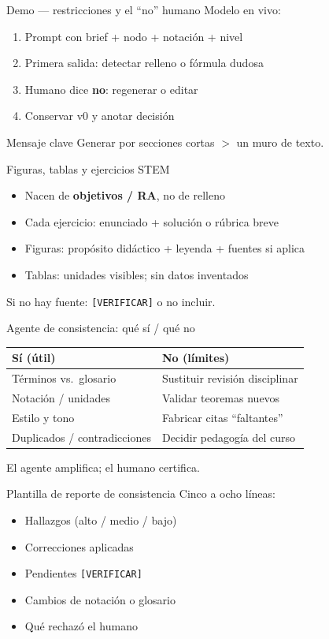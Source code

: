 \documentclass[aspectratio=169,11pt]{beamer}
\begin{document}
\begin{frame}{Demo --- restricciones y el ``no'' humano}
Modelo en vivo:
\begin{enumerate}
\item Prompt con brief + nodo + notación + nivel
\item Primera salida: detectar relleno o fórmula dudosa
\item Humano dice \textbf{no}: regenerar o editar
\item Conservar v0 y anotar decisión
\end{enumerate}
\begin{alertblock}{Mensaje clave}
Generar por secciones cortas $>$ un muro de texto.
\end{alertblock}
\end{frame}

\begin{frame}{Figuras, tablas y ejercicios STEM}
\begin{itemize}
\item Nacen de \textbf{objetivos / RA}, no de relleno
\item Cada ejercicio: enunciado + solución o rúbrica breve
\item Figuras: propósito didáctico + leyenda + fuentes si aplica
\item Tablas: unidades visibles; sin datos inventados
\end{itemize}
Si no hay fuente: \texttt{[VERIFICAR]} o no incluir.
\end{frame}

\begin{frame}{Agente de consistencia: qué sí / qué no}
\begin{tabularx}{\textwidth}{@{}XX@{}}
\toprule
\textbf{Sí (útil)} & \textbf{No (límites)} \\
\midrule
Términos vs.\ glosario & Sustituir revisión disciplinar \\
Notación / unidades & Validar teoremas nuevos \\
Estilo y tono & Fabricar citas ``faltantes'' \\
Duplicados / contradicciones & Decidir pedagogía del curso \\
\bottomrule
\end{tabularx}
\vspace{0.8em}
El agente amplifica; el humano certifica.
\end{frame}

\begin{frame}{Plantilla de reporte de consistencia}
Cinco a ocho líneas:
\begin{itemize}
\item Hallazgos (alto / medio / bajo)
\item Correcciones aplicadas
\item Pendientes \texttt{[VERIFICAR]}
\item Cambios de notación o glosario
\item Qué rechazó el humano
\end{itemize}
\end{frame}
\end{document}
